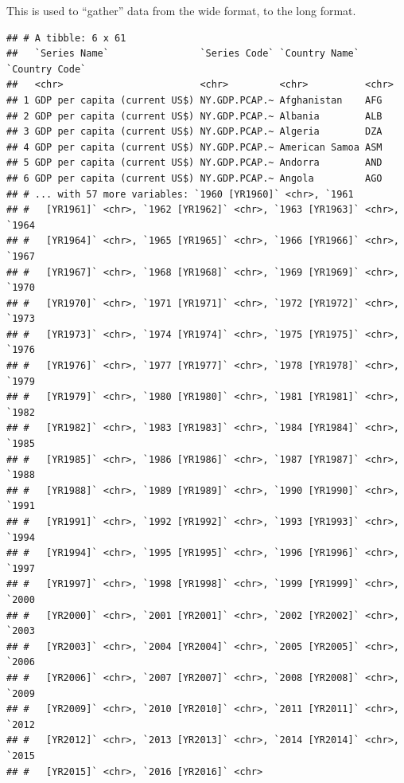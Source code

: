 \documentclass[11pt,]{article}
\newenvironment{Shaded}{\begin{snugshade}}{\end{snugshade}}
\newcommand{\KeywordTok}[1]{\textcolor[rgb]{0.13,0.29,0.53}{\textbf{#1}}}
\newcommand{\StringTok}[1]{\textcolor[rgb]{0.31,0.60,0.02}{#1}}
\newcommand{\OperatorTok}[1]{\textcolor[rgb]{0.81,0.36,0.00}{\textbf{#1}}}
\newcommand{\NormalTok}[1]{#1}
\begin{document}
This is used to ``gather'' data from the wide format, to the long
format.

\begin{Shaded}
\end{Shaded}

\begin{verbatim}
## # A tibble: 6 x 61
##   `Series Name`                `Series Code` `Country Name` `Country Code`
##   <chr>                        <chr>         <chr>          <chr>         
## 1 GDP per capita (current US$) NY.GDP.PCAP.~ Afghanistan    AFG           
## 2 GDP per capita (current US$) NY.GDP.PCAP.~ Albania        ALB           
## 3 GDP per capita (current US$) NY.GDP.PCAP.~ Algeria        DZA           
## 4 GDP per capita (current US$) NY.GDP.PCAP.~ American Samoa ASM           
## 5 GDP per capita (current US$) NY.GDP.PCAP.~ Andorra        AND           
## 6 GDP per capita (current US$) NY.GDP.PCAP.~ Angola         AGO           
## # ... with 57 more variables: `1960 [YR1960]` <chr>, `1961
## #   [YR1961]` <chr>, `1962 [YR1962]` <chr>, `1963 [YR1963]` <chr>, `1964
## #   [YR1964]` <chr>, `1965 [YR1965]` <chr>, `1966 [YR1966]` <chr>, `1967
## #   [YR1967]` <chr>, `1968 [YR1968]` <chr>, `1969 [YR1969]` <chr>, `1970
## #   [YR1970]` <chr>, `1971 [YR1971]` <chr>, `1972 [YR1972]` <chr>, `1973
## #   [YR1973]` <chr>, `1974 [YR1974]` <chr>, `1975 [YR1975]` <chr>, `1976
## #   [YR1976]` <chr>, `1977 [YR1977]` <chr>, `1978 [YR1978]` <chr>, `1979
## #   [YR1979]` <chr>, `1980 [YR1980]` <chr>, `1981 [YR1981]` <chr>, `1982
## #   [YR1982]` <chr>, `1983 [YR1983]` <chr>, `1984 [YR1984]` <chr>, `1985
## #   [YR1985]` <chr>, `1986 [YR1986]` <chr>, `1987 [YR1987]` <chr>, `1988
## #   [YR1988]` <chr>, `1989 [YR1989]` <chr>, `1990 [YR1990]` <chr>, `1991
## #   [YR1991]` <chr>, `1992 [YR1992]` <chr>, `1993 [YR1993]` <chr>, `1994
## #   [YR1994]` <chr>, `1995 [YR1995]` <chr>, `1996 [YR1996]` <chr>, `1997
## #   [YR1997]` <chr>, `1998 [YR1998]` <chr>, `1999 [YR1999]` <chr>, `2000
## #   [YR2000]` <chr>, `2001 [YR2001]` <chr>, `2002 [YR2002]` <chr>, `2003
## #   [YR2003]` <chr>, `2004 [YR2004]` <chr>, `2005 [YR2005]` <chr>, `2006
## #   [YR2006]` <chr>, `2007 [YR2007]` <chr>, `2008 [YR2008]` <chr>, `2009
## #   [YR2009]` <chr>, `2010 [YR2010]` <chr>, `2011 [YR2011]` <chr>, `2012
## #   [YR2012]` <chr>, `2013 [YR2013]` <chr>, `2014 [YR2014]` <chr>, `2015
## #   [YR2015]` <chr>, `2016 [YR2016]` <chr>
\end{verbatim}
\end{document}
